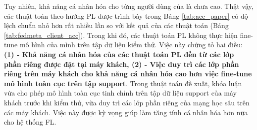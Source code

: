 Tuy nhiên, khả năng cá nhân hóa cho từng người dùng của  là chưa cao. Thật vậy, các thuật toán theo hướng PL được trình bày trong Bảng \ref{tab:acc_paper} có độ lệch chuẩn nhỏ hơn rất nhiều lần so với kết quả của các thuật toán  (Bảng \ref{tab:fedmeta_client_acc}). Trong khi đó, các thuật toán PL không thực hiện fine-tune mô hình của mình trên tập dữ liệu kiểm thử. Việc này chứng tỏ hai điều: \textbf{(1) - Khả năng cá nhân hóa của các thuật toán PL đến từ các lớp phần riêng được đặt tại máy khách, (2) - Việc duy trì các lớp phần riêng trên máy khách cho khả năng cá nhân hóa cao hơn việc fine-tune mô hình toàn cục trên tập support}. Trong thuật toán đề xuất, khóa luận vừa cho phép mô hình toàn cục tinh chỉnh trên tập dữ liệu support của máy khách trước khi kiểm thử, vừa duy trì các lớp phần riêng của mạng học sâu trên các máy khách. Việc này được kỳ vọng giúp làm tăng tính cá nhân hóa hơn nữa cho hệ thống FL.

